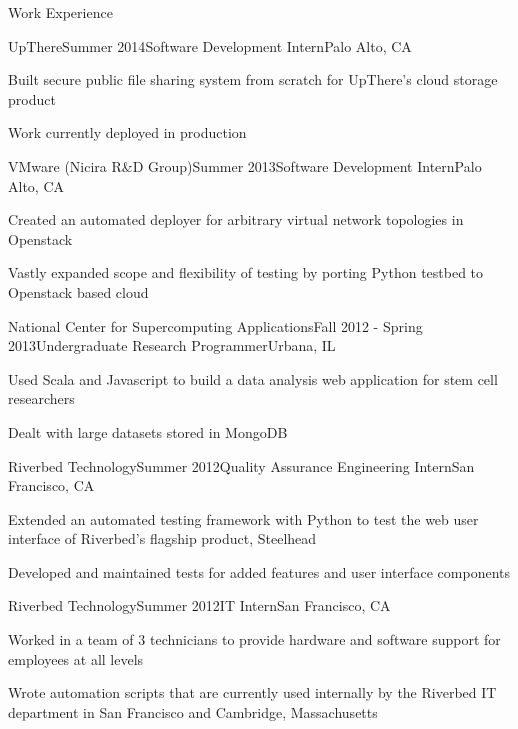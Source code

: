 \documentclass{resume} %
\begin{document}
\begin{rSection}{Work Experience}

\begin{rSubsection}{UpThere}{Summer 2014}{Software Development Intern}{Palo
    Alto, CA}
\item Built secure public file sharing system from scratch for UpThere's cloud
    storage product
\item Work currently deployed in production
\end{rSubsection}

\begin{rSubsection}{VMware (Nicira R\&D Group)}{Summer 2013}{Software Development Intern}{Palo Alto, CA}
\item Created an automated deployer for arbitrary virtual network topologies in Openstack
\item  Vastly expanded scope and flexibility of testing by porting Python testbed to Openstack based cloud
\end{rSubsection}

\begin{rSubsection}{National Center for Supercomputing Applications}{Fall 2012 - Spring 2013}{Undergraduate Research Programmer}{Urbana, IL}
\item Used Scala and Javascript to build a data analysis web application for stem cell researchers
\item Dealt with large datasets stored in MongoDB
\end{rSubsection}

\begin{rSubsection}{Riverbed Technology}{Summer 2012}{Quality Assurance Engineering Intern}{San Francisco, CA}
\item Extended an automated testing framework with Python to test the web user interface of Riverbed's flagship product, Steelhead 
\item Developed and maintained tests for added features and user interface components
\end{rSubsection}

\begin{rSubsection}{Riverbed Technology}{Summer 2012}{IT Intern}{San Francisco, CA}
\item Worked in a team of 3 technicians to provide hardware and software support for employees at all levels 
\item Wrote automation scripts that are currently used internally by the Riverbed IT department in San Francisco and Cambridge, Massachusetts
\end{rSubsection}

\end{rSection}
\end{document}
